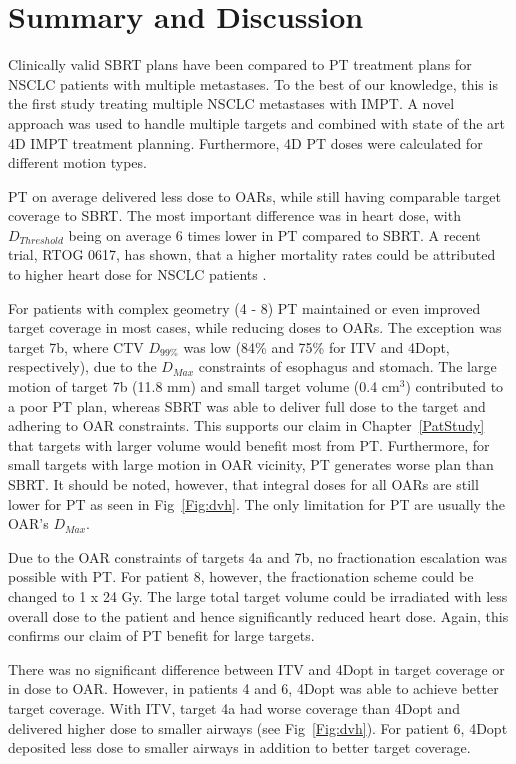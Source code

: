 \documentclass[type=dr, dr=rernat, accentcolor=tud7b,colorbacktitle, bigchapter, openright, twoside, 12pt ]{tudthesis}
\begin{document}
\section{Summary and Discussion}

Clinically valid SBRT plans have been compared to PT treatment plans for NSCLC patients with multiple metastases. 
To the best of our knowledge, this is the first study treating multiple NSCLC metastases with IMPT. A novel approach was used to handle multiple targets and combined
with state of the art 4D IMPT treatment planning. Furthermore, 4D PT doses were calculated for different motion types. 

PT on average delivered less dose to OARs, while still having comparable target coverage to SBRT.
The most important difference was in heart dose, with $D_{Threshold}$ being on average 6 times lower in PT compared to SBRT. A recent trial, RTOG 0617, has shown,
that a higher mortality rates could be attributed to higher heart dose for NSCLC patients \cite{Bradley2015}.

For patients with complex geometry (4 - 8) PT maintained or even improved target coverage in most cases, while reducing doses to OARs.
The exception was target 7b, where CTV $D_{99\%}$ was low (84\% and 75\% for ITV and 4Dopt, respectively), due to the $D_{Max}$ constraints of esophagus and stomach.
The large motion of target 7b (11.8 mm) and small target volume (0.4 cm$^3$) contributed to a poor PT plan, whereas SBRT was able to deliver full dose to the target
and adhering to OAR constraints. This supports our claim in Chapter~\ref{PatStudy} that targets with larger volume would benefit most from PT. Furthermore, for small targets
with large motion in OAR vicinity, PT generates worse plan than SBRT. It should be noted, however, that integral doses for all OARs are still lower for PT as seen in Fig~\ref{Fig:dvh}.
The only limitation for PT are usually the OAR's $D_{Max}$.

Due to the OAR constraints of targets 4a and 7b, no fractionation escalation was possible with PT. 
For patient 8, however, the fractionation scheme could be changed to 1 x 24 Gy. The large total target volume could be irradiated with less
overall dose to the patient and hence significantly reduced heart dose. Again, this confirms our claim of PT benefit for large targets.


There was no significant difference between ITV and 4Dopt in target coverage or in dose to OAR. 
However, in patients 4 and 6, 4Dopt was able to achieve better target coverage. With ITV, target 4a had worse coverage than 4Dopt and delivered higher dose to 
smaller airways (see Fig~\ref{Fig:dvh}). For patient 6, 4Dopt deposited less dose to smaller airways in addition to better target coverage.
\end{document}
